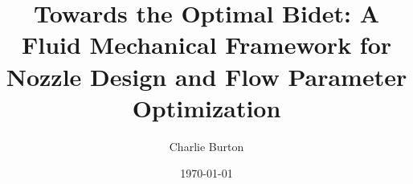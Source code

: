 \documentclass[aps,prfluids,reprint,amsmath,amssymb,floatfix]{revtex4-2}
\begin{document}
\title{Towards the Optimal Bidet: A Fluid Mechanical Framework
  for Nozzle Design and Flow Parameter Optimization}

\author{Charlie Burton}

\date{\today}
\end{document}
